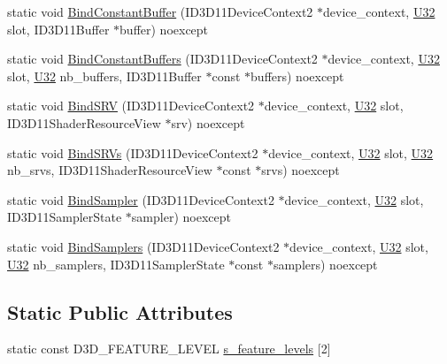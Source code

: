 \begin{DoxyCompactItemize}
\item 
static void \hyperlink{structmage_1_1_pipeline_a2a8881b46ebaa61101fd1a61cb066afb}{Bind\+Constant\+Buffer} (I\+D3\+D11\+Device\+Context2 $\ast$device\+\_\+context, \hyperlink{namespacemage_a41c104c036fba3756a74e19f793eeaa1}{U32} slot, I\+D3\+D11\+Buffer $\ast$buffer) noexcept
\item 
static void \hyperlink{structmage_1_1_pipeline_af423b32e913656f6fd426abe2decd01c}{Bind\+Constant\+Buffers} (I\+D3\+D11\+Device\+Context2 $\ast$device\+\_\+context, \hyperlink{namespacemage_a41c104c036fba3756a74e19f793eeaa1}{U32} slot, \hyperlink{namespacemage_a41c104c036fba3756a74e19f793eeaa1}{U32} nb\+\_\+buffers, I\+D3\+D11\+Buffer $\ast$const $\ast$buffers) noexcept
\item 
static void \hyperlink{structmage_1_1_pipeline_a8a2eed6c6dc2216ee9c9db2a490b73ab}{Bind\+S\+RV} (I\+D3\+D11\+Device\+Context2 $\ast$device\+\_\+context, \hyperlink{namespacemage_a41c104c036fba3756a74e19f793eeaa1}{U32} slot, I\+D3\+D11\+Shader\+Resource\+View $\ast$srv) noexcept
\item 
static void \hyperlink{structmage_1_1_pipeline_a31b1d7e372ebccaa10d35f570f0c79b6}{Bind\+S\+R\+Vs} (I\+D3\+D11\+Device\+Context2 $\ast$device\+\_\+context, \hyperlink{namespacemage_a41c104c036fba3756a74e19f793eeaa1}{U32} slot, \hyperlink{namespacemage_a41c104c036fba3756a74e19f793eeaa1}{U32} nb\+\_\+srvs, I\+D3\+D11\+Shader\+Resource\+View $\ast$const $\ast$srvs) noexcept
\item 
static void \hyperlink{structmage_1_1_pipeline_a0cc41ae7b420a8ac482c103356de342b}{Bind\+Sampler} (I\+D3\+D11\+Device\+Context2 $\ast$device\+\_\+context, \hyperlink{namespacemage_a41c104c036fba3756a74e19f793eeaa1}{U32} slot, I\+D3\+D11\+Sampler\+State $\ast$sampler) noexcept
\item 
static void \hyperlink{structmage_1_1_pipeline_a198f527044ca49f3f29db9aa3260ac7a}{Bind\+Samplers} (I\+D3\+D11\+Device\+Context2 $\ast$device\+\_\+context, \hyperlink{namespacemage_a41c104c036fba3756a74e19f793eeaa1}{U32} slot, \hyperlink{namespacemage_a41c104c036fba3756a74e19f793eeaa1}{U32} nb\+\_\+samplers, I\+D3\+D11\+Sampler\+State $\ast$const $\ast$samplers) noexcept
\end{DoxyCompactItemize}
\subsection*{Static Public Attributes}
\begin{DoxyCompactItemize}
\item 
static const D3\+D\+\_\+\+F\+E\+A\+T\+U\+R\+E\+\_\+\+L\+E\+V\+EL \hyperlink{structmage_1_1_pipeline_a2b8c39e47ee583beb55fa1a8741deb4a}{s\+\_\+feature\+\_\+levels} \mbox{[}2\mbox{]}
\end{DoxyCompactItemize}
